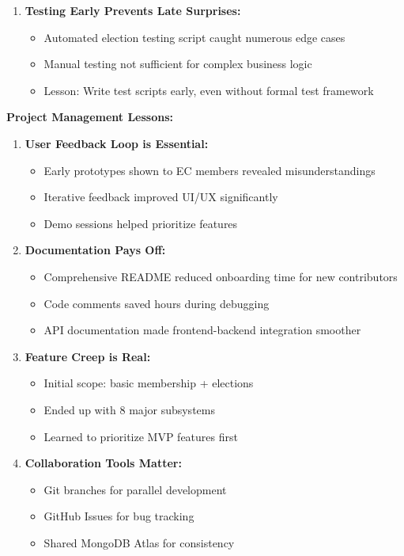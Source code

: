 \documentclass[12pt,a4paper]{article}
\begin{document}
\begin{enumerate}[noitemsep]
  \item \textbf{Testing Early Prevents Late Surprises:}
  \begin{itemize}[noitemsep]
    \item Automated election testing script caught numerous edge cases
    \item Manual testing not sufficient for complex business logic
    \item Lesson: Write test scripts early, even without formal test framework
  \end{itemize}
\end{enumerate}

\textbf{Project Management Lessons:}

\begin{enumerate}[noitemsep]
  \item \textbf{User Feedback Loop is Essential:}
  \begin{itemize}[noitemsep]
    \item Early prototypes shown to EC members revealed misunderstandings
    \item Iterative feedback improved UI/UX significantly
    \item Demo sessions helped prioritize features
  \end{itemize}
  
  \item \textbf{Documentation Pays Off:}
  \begin{itemize}[noitemsep]
    \item Comprehensive README reduced onboarding time for new contributors
    \item Code comments saved hours during debugging
    \item API documentation made frontend-backend integration smoother
  \end{itemize}
  
  \item \textbf{Feature Creep is Real:}
  \begin{itemize}[noitemsep]
    \item Initial scope: basic membership + elections
    \item Ended up with 8 major subsystems
    \item Learned to prioritize MVP features first
  \end{itemize}
  
  \item \textbf{Collaboration Tools Matter:}
  \begin{itemize}[noitemsep]
    \item Git branches for parallel development
    \item GitHub Issues for bug tracking
    \item Shared MongoDB Atlas for consistency
  \end{itemize}
\end{enumerate}
\end{document}

